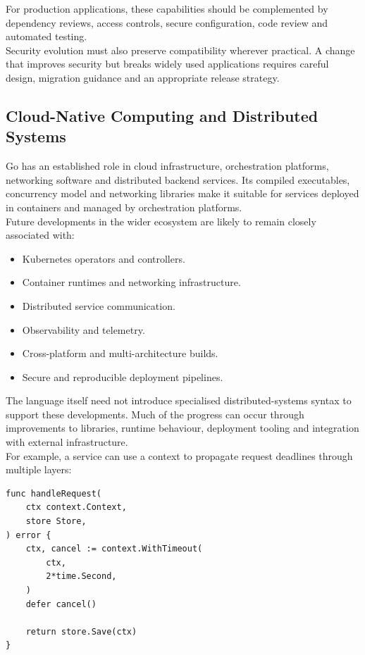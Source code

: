 For production applications, these capabilities should be complemented by dependency reviews, access controls, secure configuration, code review and automated testing.\\

Security evolution must also preserve compatibility wherever practical. A change that improves security but breaks widely used applications requires careful design, migration guidance and an appropriate release strategy.

\subsection{Cloud-Native Computing and Distributed Systems}

Go has an established role in cloud infrastructure, orchestration platforms, networking software and distributed backend services. Its compiled executables, concurrency model and networking libraries make it suitable for services deployed in containers and managed by orchestration platforms.\\

Future developments in the wider ecosystem are likely to remain closely associated with:

\begin{itemize}
    \item Kubernetes operators and controllers.
    \item Container runtimes and networking infrastructure.
    \item Distributed service communication.
    \item Observability and telemetry.
    \item Cross-platform and multi-architecture builds.
    \item Secure and reproducible deployment pipelines.
\end{itemize}

The language itself need not introduce specialised distributed-systems syntax to support these developments. Much of the progress can occur through improvements to libraries, runtime behaviour, deployment tooling and integration with external infrastructure.\\

For example, a service can use a context to propagate request deadlines through multiple layers:

\begin{lstlisting}
func handleRequest(
    ctx context.Context,
    store Store,
) error {
    ctx, cancel := context.WithTimeout(
        ctx,
        2*time.Second,
    )
    defer cancel()

    return store.Save(ctx)
}
\end{lstlisting}

